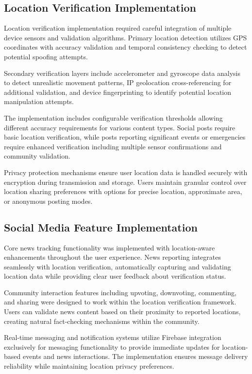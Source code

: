\subsection{Location Verification Implementation}
\label{subsec:location-implementation}

Location verification implementation required careful integration of multiple device sensors and validation algorithms. Primary location detection utilizes GPS coordinates with accuracy validation and temporal consistency checking to detect potential spoofing attempts.

Secondary verification layers include accelerometer and gyroscope data analysis to detect unrealistic movement patterns, IP geolocation cross-referencing for additional validation, and device fingerprinting to identify potential location manipulation attempts.

The implementation includes configurable verification thresholds allowing different accuracy requirements for various content types. Social posts require basic location verification, while posts reporting significant events or emergencies require enhanced verification including multiple sensor confirmations and community validation.

Privacy protection mechanisms ensure user location data is handled securely with encryption during transmission and storage. Users maintain granular control over location sharing preferences with options for precise location, approximate area, or anonymous posting modes.

\subsection{Social Media Feature Implementation}
\label{subsec:social-implementation}

Core news tracking functionality was implemented with location-aware enhancements throughout the user experience. News reporting integrates seamlessly with location verification, automatically capturing and validating location data while providing clear user feedback about verification status.

Community interaction features including upvoting, downvoting, commenting, and sharing were designed to work within the location verification framework. Users can validate news content based on their proximity to reported locations, creating natural fact-checking mechanisms within the community.

Real-time messaging and notification systems utilize Firebase integration exclusively for messaging functionality to provide immediate updates for location-based events and news interactions. The implementation ensures message delivery reliability while maintaining location privacy preferences.

